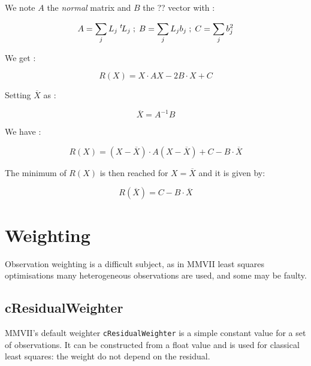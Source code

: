 We note $A$ the \emph{normal} matrix and $B$ the ?? vector  with :

\begin{equation}
	A =   \sum_j L_j  \; ^{t} \! L_j  \; ; \;  B =\sum_j L_j b_j  \; ; \; C =  \sum_j b_j ^2
\end{equation}

We get :

\begin{equation}
	R(X) =  X \cdot A X - 2 B \cdot X +  C
\end{equation}


Setting $\overline X$ as :

\begin{equation}
	\overline X = A^{-1} B \label{LstSq:Sol}
\end{equation}

We have :

\begin{equation}
	R(X) =  (X-\overline X ) \cdot A  (X-\overline X )   +  C - B \cdot \overline X 
\end{equation}

The minimum of $R(X)$ is then reached for $X=\overline X$ and it is given by:

\begin{equation}
	R(\overline X) =    C - B \cdot \overline X \label{Lst:Res:Min}
\end{equation}



\section{Weighting}

Observation weighting is a difficult subject, as in MMVII least squares
optimisations many heterogeneous observations are used, and some may be
faulty.

\subsection{cResidualWeighter}

MMVII's default weighter \texttt{cResidualWeighter} is a simple constant value
for a set of observations.
It can be constructed from a float value and is used for classical least squares:
the weight do not depend on the residual.

